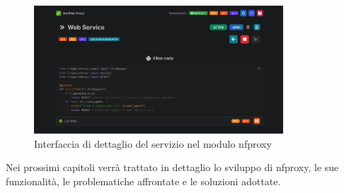 \begin{figure}[H]
    \centering
    \includegraphics[width=0.83\textwidth]{images/chapter2/NFProxyInterface.png}
    \caption{Interfaccia di dettaglio del servizio nel modulo \gls{nfproxy}}\label{fig:nfproxy_interface}
\end{figure}

Nei prossimi capitoli verrà trattato in dettaglio lo sviluppo di \gls{nfproxy}, le sue funzionalità, le problematiche affrontate e le soluzioni adottate.
